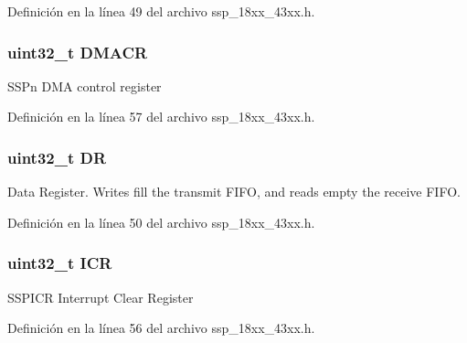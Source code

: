 Definición en la línea 49 del archivo ssp\+\_\+18xx\+\_\+43xx.\+h.

\subsubsection[{\texorpdfstring{D\+M\+A\+CR}{DMACR}}]{ uint32\+\_\+t D\+M\+A\+CR}\hypertarget{struct_l_p_c___s_s_p___t_a082219a924d748e9c6092582aec06226}{}\label{struct_l_p_c___s_s_p___t_a082219a924d748e9c6092582aec06226}
S\+S\+Pn D\+MA control register 

Definición en la línea 57 del archivo ssp\+\_\+18xx\+\_\+43xx.\+h.

\subsubsection[{\texorpdfstring{DR}{DR}}]{ uint32\+\_\+t DR}\hypertarget{struct_l_p_c___s_s_p___t_a3df0d8dfcd1ec958659ffe21eb64fa94}{}\label{struct_l_p_c___s_s_p___t_a3df0d8dfcd1ec958659ffe21eb64fa94}
Data Register. Writes fill the transmit F\+I\+FO, and reads empty the receive F\+I\+FO. 

Definición en la línea 50 del archivo ssp\+\_\+18xx\+\_\+43xx.\+h.

\subsubsection[{\texorpdfstring{I\+CR}{ICR}}]{ uint32\+\_\+t I\+CR}\hypertarget{struct_l_p_c___s_s_p___t_afc0ed459ed55267df34cf3774e7c029d}{}\label{struct_l_p_c___s_s_p___t_afc0ed459ed55267df34cf3774e7c029d}
S\+S\+P\+I\+CR Interrupt Clear Register 

Definición en la línea 56 del archivo ssp\+\_\+18xx\+\_\+43xx.\+h.

